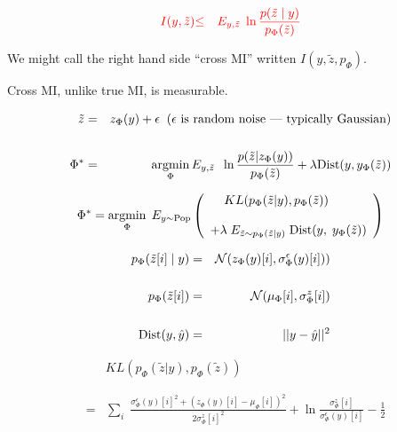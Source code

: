 {

\begin{eqnarray*}
{\color{red} I(y,\tilde{z})} & {\color{red} \leq} & {\color{red} E_{y,\tilde{z}}\;\ln \frac{p(\tilde{z}\;|\;y)}{p_\Phi(\tilde{z})}}
\end{eqnarray*}

\vfill
We might call the right hand side ``cross MI'' written $I(y,\tilde{z},p_\Phi)$.

\vfill
Cross MI, unlike true MI, is measurable.


\begin{eqnarray*}
\tilde{z} & = & z_\Phi(y) + \epsilon \;\;\mbox{($\epsilon$ is random noise --- typically Gaussian)} \\
\\
\Phi^* & = & \operatorname*{argmin}_\Phi E_{y,\tilde{z}}\; \;\ln \frac{p(\tilde{z}|z_\Phi(y))}{p_\Phi(\tilde{z})} + \lambda \mathrm{Dist}(y,y_\Phi(\tilde{z}))
\end{eqnarray*}


$$\Phi^* = \operatorname*{argmin}_{\Phi}\;E_{y\sim \mathrm{Pop}} \left(\begin{array}{l}\;\;\;\;KL(p_\Phi(\tilde{z}|y),p_\Phi(\tilde{z})) \\
\\
+ \lambda \; E_{\tilde{z}\sim p_\Phi(\tilde{z}|y)}\;\mathrm{Dist}(y,\;y_\Phi(\tilde{z}))\end{array}\right)$$

{\color{red}
\begin{eqnarray*}
p_\Phi(\tilde{z}[i]\;|\;y) & = & {\cal N}(z_\Phi(y)[i],\sigma^\epsilon_\Phi(y)[i])) \\
\\
p_\Phi(\tilde{z}[i]) & = & {\cal N}(\mu_\Phi[i],\sigma^z_\Phi[i]) \\
\\
\mathrm{Dist}(y,\hat{y}) & = & ||y-\hat{y}||^2
\end{eqnarray*}
}


\begin{eqnarray*}
& & KL(p_\Phi(\tilde{z}|y),p_\Phi(\tilde{z})) \\
\\
\\
& = & \sum_i \;\frac{\sigma^\epsilon_\Phi(y)[i]^2 + (z_\Phi(y)[i]-\mu_\Phi[i])^2}{2 \sigma^z_\Phi[i]^2}
+ \ln\frac{\sigma^z_\Phi[i]}{\sigma^\epsilon_\Phi(y)[i]} - \frac{1}{2}
\end{eqnarray*}


}
